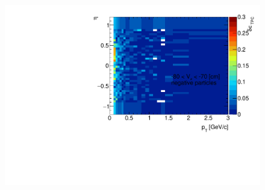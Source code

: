 \begin{figure}[H]\ContinuedFloat
	\vspace{-3.5em}
	\parbox{0.325\textwidth}{
		\includegraphics[width=\linewidth,page=32]{graphics/systematicsEfficiency/deadMaterial/secondaries_Unbinned_Charged_SD.pdf}\\
	}~
	\vspace{-4em}
\end{figure}
